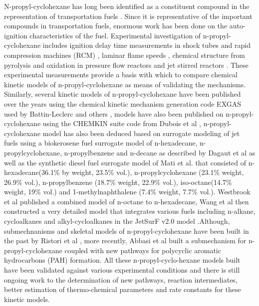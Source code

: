 N-propyl-cyclohexane has long been identified as a constituent compound in the representation of transportation fuels \cite{Pousse2010LeanN-Propylcyclohexane}. Since it is representative of the important compounds in transportation fuels, enormous work has been done on the auto-ignition characteristics of the fuel. Experimental investigation of n-propyl-cyclohexane includes ignition delay time measurements in shock tubes and rapid compression machines (RCM)  \cite{Dubois2009ExperimentalConditions}\cite{Crochet2010AConditions}\cite{Tian2014ComparativeN-Propylcyclohexane}, laminar flame speeds \cite{Pousse2010LeanN-Propylcyclohexane}\cite{Crochet2010AConditions}, chemical structure from pyrolysis and oxidation in pressure flow reactors and jet stirred reactors \cite{Bales-Gueret1992ExperimentalReactor} \cite{Ristori2001TheModeling}\cite{Dagaut2015TheStudy}\cite{Dagaut2014}\cite{Dagaut2016ExperimentalSurrogates}\cite{Gokulakrishnan2008IgnitionFuel}\cite{Gokulakrishnan2007ExperimentalConditions}. These experimental measurements provide a basis with which to compare chemical kinetic models of n-propyl-cyclohexane as means of validating the mechanisms. Similarly, several kinetic models of n-propyl-cyclohexane have been published over the years using the chemical kinetic mechanism generation code EXGAS \cite{Warth2000ComputerOxidation} used by Battin-Leclerc and others \cite{Battin-Leclerc2008DetailedSurrogates}, models have also been published on n-propyl-cyclohexane using the CHEMKIN suite code from Dubois et al \cite{Dubois2009ExperimentalConditions}, n-propyl-cyclohexane model has also been deduced based on surrogate modeling of jet fuels using a biokerosene fuel surrogate model of n-hexadecane, n-propylcyclohexane, n-propylbenzene and n-decane as described by Dagaut et al \cite{Dagaut2007ChemicalCombustion} as well as the synthetic diesel fuel surrogate model of Mati et al.\cite{Mati2007TheModeling} that consisted of n-hexadecane(36.1\% by weight, 23.5\% vol.), n-propylcyclohexane (23.1\% weight, 26.9\% vol.), n-propylbenzene (18.7\% weight, 22.9\% vol.), iso-octane(14.7\% weight, 19\% vol.) and 1-methylnaphthalene (7.4\% weight, 7.7\% vol.). Westbrook et al \cite{Westbrook2009AN-hexadecane} published a combined model of n-octane to n-hexadecane, Wang et al then constructed a very detailed model that integrates various fuels including n-alkane, cycloalkanes and alkyl-cycloalkanes in the JetSurF v2.0 model \cite{Wang2010A2.0}.Although, submechnanisms and skeletal models of n-propyl-cyclohexane have been built in the past by Ristori et al \cite{Ristori2001TheModeling}, more recently, Abbasi et al \cite{Abbasi2018KineticFormation} built a submechanism for n-propyl-cyclohexane coupled with new pathways for polycyclic aromatic hydrocarbons (PAH) formation. All these n-propyl-cyclo-hexane models built have been validated against various experimental conditions and there is still ongoing work to the determination of new pathways, reaction intermediates, better estimation of thermo-chemical parameters and rate constants for these kinetic models. \par

